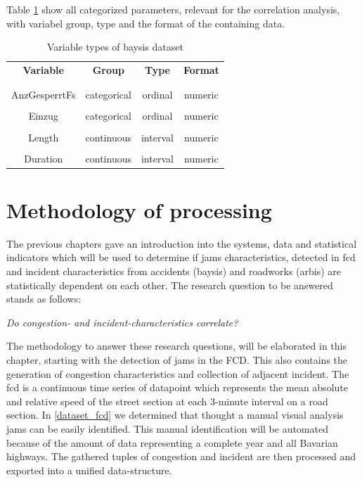 \documentclass[a4paper,headsepline,footsepline,fontsize=11pt,BCOR=12mm,DIV=12]{report}
\begin{document}
\bigskip

Table \ref{table:table_arbis_paramters} show all categorized parameters, relevant for the correlation analysis, with variabel group, type and the format of the containing data.
	
\begin{table}[ht]
	\centering
	\begin{tabular}{c|c|c|c}
		\textbf{Variable} 	& \textbf{Group} 	& \textbf{Type} 		& \textbf{Format} \\
		\\[-1em]
		\hline
		\\[-1em]
		AnzGesperrtFs  	& categorical 	& ordinal 	& numeric\\
		\hline
		\\[-1em]
		Einzug  		& categorical 	& ordinal 	& numeric\\
		\hline
		\\[-1em]
		Length  		& continuous 	& interval 	& numeric\\
		\hline
		\\[-1em]
		Duration  		& continuous 	& interval 	& numeric\\
	\end{tabular}
	\caption{Variable types of \acrshort{baysis} dataset}
	\label{table:table_arbis_paramters}
\end{table}

\chapter{Methodology of processing}
\label{methodology}
The previous chapters gave an introduction into the systems, data and statistical indicators which will be used to determine if jams characteristics, detected in \acrshort{fcd} and incident characteristics from accidents (\acrshort{baysis}) and roadworks (\acrshort{arbis}) are statistically dependent on each other. The research question to be answered stands as follows:

\begin{center}
	\textit{Do congestion- and incident-characteristics correlate?}
\end{center}

\medskip

The methodology to answer these research questions, will be elaborated in this chapter, starting with the detection of jams in the FCD. This also contains the generation of congestion characteristics and collection of adjacent incident. The \acrshort{fcd} is a continuous time series of datapoint which represents the mean absolute and relative speed of the street section at each 3-minute interval on a road section. In \ref{dataset_fcd} we determined that thought a manual visual analysis jams can be easily identified. This manual identification will be automated because of the amount of data representing a complete year and all Bavarian highways. The gathered tuples of congestion and incident are then processed and exported into a unified data-structure. 
\end{document}
